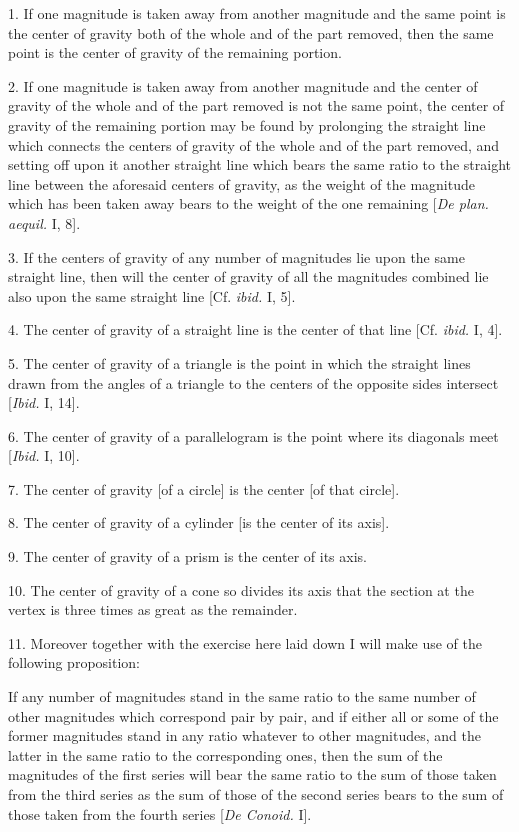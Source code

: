 \documentclass[12pt]{article}
\begin{document}
1. If one magnitude is taken away from another magnitude and the same
point is the center of gravity both of the whole and of the part
removed, then the same point is the center of gravity of the remaining
portion.

2. If one magnitude is taken away from another magnitude and the
center of gravity of the whole and of the part removed is not the same
point, the center of gravity of the remaining portion may be found by
prolonging the straight line which connects the centers of gravity of
the whole and of the part removed, and setting off upon it another
straight line which bears the same ratio to the straight line between
the aforesaid centers of gravity, as the weight of the magnitude which
has been taken away bears to the weight of the one remaining [\emph{De
plan. aequil.} I, 8].

3. If the centers of gravity of any number of magnitudes lie upon the
same straight line, then will the center of gravity of all the
magnitudes combined lie also upon the same straight line [Cf.
\emph{ibid.} I, 5].

4. The center of gravity of a straight line is the center of that line
[Cf. \emph{ibid.} I, 4].

5. The center of gravity of a triangle is the point in which the
straight lines drawn from the angles of a triangle to the centers of
the opposite sides intersect [\emph{Ibid.} I, 14].

6. The center of gravity of a parallelogram is the point where its
diagonals meet [\emph{Ibid.} I, 10].

7. The center of gravity [of a circle] is the center [of that circle].

8. The center of gravity of a cylinder [is the center of its axis].

9. The center of gravity of a prism is the center of its axis.

10. The center of gravity of a cone so divides its axis that the
section at the vertex is three times as great as the remainder.

11. Moreover together with the exercise here laid down I will make use
of the following proposition:

If any number of magnitudes stand in the same ratio to the same number
of other magnitudes which correspond pair by pair, and if either all
or some of the former magnitudes stand in any ratio whatever to other
magnitudes, and the latter in the same ratio to the corresponding
ones, then the sum of the magnitudes of the first series will bear the
same ratio to the sum of those taken from the third series as the sum
of those of the second series bears to the sum of those taken from the
fourth series [\emph{De Conoid.} I].
\end{document}
